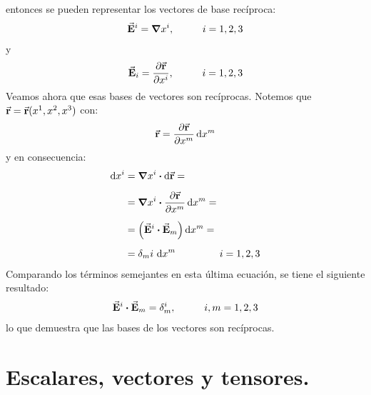 \documentclass[hidelinks,12pt]{article}
\begin{document}
entonces se pueden representar los vectores de base recíproca:
\begin{align}
\va{E}^{i} = \grad{x^{i}}, \hspace{1cm} i = 1, 2, 3
\label{eq:ecuacion_01_02_25}
\end{align}
y
\begin{align}
\va{E}_{i} = \pdv{\va{r}}{x^{i}}, \hspace{1cm} i = 1, 2, 3
\label{eq:ecuacion_01_02_26}
\end{align}
Veamos ahora que esas bases de vectores son recíprocas. \hfill \break Notemos que $\va{r} = \va{r} (x^{1}, x^{2}, x^{3})$ con:
\begin{align}
\va{r} = \pdv{\va{r}}{x^{m}} \dd{x^{m}}
\label{eq:ecuacion_01_02_27}
\end{align}
y en consecuencia:
\begin{align}
\begin{aligned}[b]
\dd{x^{i}} &= \grad{x^{i}} \vdot \dd{\va{r}} = \\[0.5em]
&= \grad{x^{i}} \vdot \pdv{\va{r}}{x^{m}} \dd{x^{m}} = \\[0.5em]
&= \left( \va{E}^{i} \vdot \va{E}_{m} \right) \dd{x^{m}} = \\[0.5em]
&= \delta_{m}{i} \, \dd{x^{m}} \hspace{1.5cm} i = 1, 2, 3
\end{aligned}
\label{eq:ecuacion_01_02_28}
\end{align}
Comparando los términos semejantes en esta última ecuación, se tiene el siguiente resultado:
\begin{align}
\va{E}^{i} \vdot \va{E}_{m} = \delta_{m}^{i}, \hspace{1cm} i, m = 1, 2, 3
\label{eq:ecuacion_01_02_29}
\end{align}
lo que demuestra que las bases de los vectores son recíprocas.

\section{Escalares, vectores y tensores.}
\end{document}
